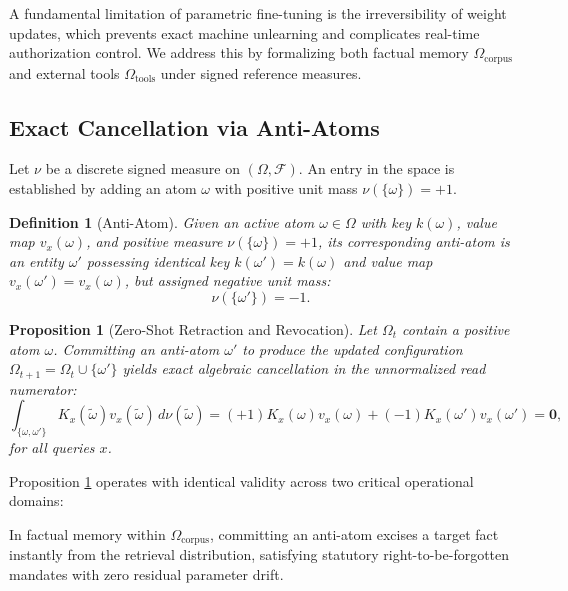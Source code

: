 \documentclass[preprint,12pt]{elsarticle}
\newtheorem{definition}{Definition}
\newtheorem{proposition}{Proposition}
\begin{document}
A fundamental limitation of parametric fine-tuning is the irreversibility of weight updates, which prevents exact machine unlearning and complicates real-time authorization control. We address this by formalizing both factual memory $\Omega_{\mathrm{corpus}}$ and external tools $\Omega_{\mathrm{tools}}$ under signed reference measures.

\subsection{Exact Cancellation via Anti-Atoms}

Let $\nu$ be a discrete signed measure on $(\Omega, \mathcal{F})$. An entry in the space is established by adding an atom $\omega$ with positive unit mass $\nu(\{\omega\}) = +1$.

\begin{definition}[Anti-Atom]
Given an active atom $\omega \in \Omega$ with key $k(\omega)$, value map $v_x(\omega)$, and positive measure $\nu(\{\omega\}) = +1$, its corresponding anti-atom is an entity $\omega'$ possessing identical key $k(\omega') = k(\omega)$ and value map $v_x(\omega') = v_x(\omega)$, but assigned negative unit mass:
\begin{equation}
\nu(\{\omega'\}) = -1.
\end{equation}
\end{definition}

\begin{proposition}[Zero-Shot Retraction and Revocation]
Let $\Omega_t$ contain a positive atom $\omega$. Committing an anti-atom $\omega'$ to produce the updated configuration $\Omega_{t+1} = \Omega_t \cup \{\omega'\}$ yields exact algebraic cancellation in the unnormalized read numerator:
\begin{equation}
\int_{\{\omega, \omega'\}} K_x(\tilde{\omega}) v_x(\tilde{\omega}) \, d\nu(\tilde{\omega}) = (+1) K_x(\omega) v_x(\omega) + (-1) K_x(\omega') v_x(\omega') = \mathbf{0},
\end{equation}
for all queries $x$.
\label{prop:anti_atom}
\end{proposition}

Proposition \ref{prop:anti_atom} operates with identical validity across two critical operational domains:

In factual memory within $\Omega_{\mathrm{corpus}}$, committing an anti-atom excises a target fact instantly from the retrieval distribution, satisfying statutory right-to-be-forgotten mandates with zero residual parameter drift.
\end{document}
